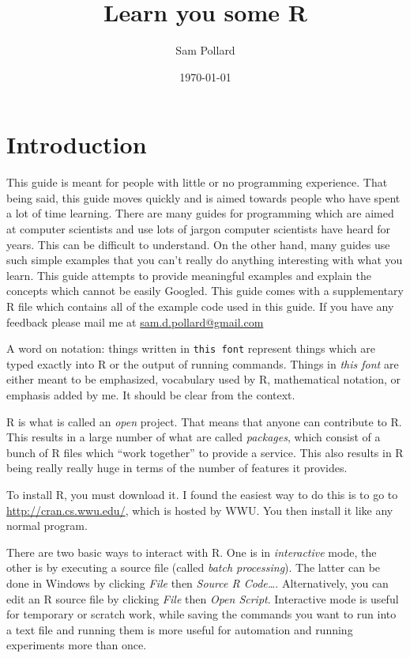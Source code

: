 \documentclass[12pt]{article}
\begin{document}
\title{Learn you some R}
\author{Sam Pollard}
\date{\today}
\maketitle

\section{Introduction}

This guide is meant for people with little or no programming experience. That being said, this guide moves quickly and is aimed towards people who have spent a lot of time learning. There are many guides for programming which are aimed at computer scientists and use lots of jargon computer scientists have heard for years. This can be difficult to understand. On the other hand, many guides use such simple examples that you can't really do anything interesting with what you learn. This guide attempts to provide meaningful examples and explain the concepts which cannot be easily Googled. This guide comes with a supplementary R file which contains all of the example code used in this guide. If you have any feedback please mail me at \url{sam.d.pollard@gmail.com}

A word on notation: things written in \verb|this font| represent things which are typed exactly into R or the output of running commands. Things in \emph{this font} are either meant to be emphasized, vocabulary used by R, mathematical notation, or emphasis added by me. It should be clear from the context.

R is what is called an \emph{open} project. That means that anyone can contribute to R. This results in a large number of what are called \emph{packages}, which consist of a bunch of R files which ``work together'' to provide a service. This also results in R being really really huge in terms of the number of features it provides.

To install R, you must download it. I found the easiest way to do this is to go to \url{http://cran.cs.wwu.edu/}, which is hosted by WWU. You then install it like any normal program.

There are two basic ways to interact with R. One is in \emph{interactive} mode, the other is by executing a source file (called \emph{batch processing}). The latter can be done in Windows by clicking \emph{File} then \emph{Source R Code\dots}. Alternatively, you can edit an R source file by clicking \emph{File} then \emph{Open Script}. Interactive mode is useful for temporary or scratch work, while saving the commands you want to run into a text file and running them is more useful for automation and running experiments more than once.
\end{document}
